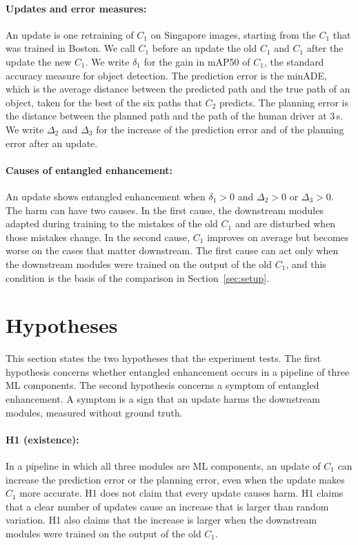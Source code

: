 \documentclass[11pt,a4paper]{article}
\begin{document}
\paragraph{Updates and error measures:} An update is one retraining of $C_1$
on Singapore images, starting from the $C_1$ that was trained in Boston. We
call $C_1$ before an update the old $C_1$ and $C_1$ after the update the new
$C_1$. We write $\delta_1$ for the gain in mAP50 of $C_1$, the standard
accuracy measure for object detection. The prediction error is the minADE,
which is the average distance between the predicted path and the true path
of an object, taken for the best of the six paths that $C_2$ predicts. The
planning error is the distance between the planned path and the path of the
human driver at 3\,s. We write $\Delta_2$ and $\Delta_3$ for the increase of
the prediction error and of the planning error after an update.

\paragraph{Causes of entangled enhancement:} An update shows entangled
enhancement when $\delta_1 > 0$ and $\Delta_2 > 0$ or $\Delta_3 > 0$. The
harm can have two causes. In the first cause, the downstream modules adapted
during training to the mistakes of the old $C_1$ and are disturbed when those
mistakes change. In the second cause, $C_1$ improves on average but becomes
worse on the cases that matter downstream. The first cause can act only when
the downstream modules were trained on the output of the old $C_1$, and this
condition is the basis of the comparison in Section~\ref{sec:setup}.

\section{Hypotheses}

This section states the two hypotheses that the experiment tests. The first
hypothesis concerns whether entangled enhancement occurs in a pipeline of
three ML components. The second hypothesis concerns a symptom of entangled
enhancement. A symptom is a sign that an update harms the downstream modules,
measured without ground truth.

\paragraph{H1 (existence):} In a pipeline in which all three modules are ML
components, an update of $C_1$ can increase the prediction error or the
planning error, even when the update makes $C_1$ more accurate. H1 does not
claim that every update causes harm. H1 claims that a clear number of updates
cause an increase that is larger than random variation. H1 also claims that
the increase is larger when the downstream modules were trained on the output
of the old $C_1$.
\end{document}
